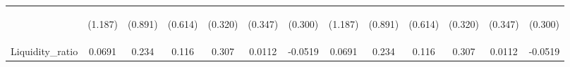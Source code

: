 \documentclass[]{article}
\begin{document}
\begin{center}
\begin{tabular}{lcccccccccccc}
\vspace{4pt} & \begin{footnotesize}(1.187)\end{footnotesize} & \begin{footnotesize}(0.891)\end{footnotesize} & \begin{footnotesize}(0.614)\end{footnotesize} & \begin{footnotesize}(0.320)\end{footnotesize} & \begin{footnotesize}(0.347)\end{footnotesize} & \begin{footnotesize}(0.300)\end{footnotesize} & \begin{footnotesize}(1.187)\end{footnotesize} & \begin{footnotesize}(0.891)\end{footnotesize} & \begin{footnotesize}(0.614)\end{footnotesize} & \begin{footnotesize}(0.320)\end{footnotesize} & \begin{footnotesize}(0.347)\end{footnotesize} & \begin{footnotesize}(0.300)\end{footnotesize} \\
Liquidity\_ratio & 0.0691 & 0.234 & 0.116 & 0.307 & 0.0112 & -0.0519 & 0.0691 & 0.234 & 0.116 & 0.307 & 0.0112 & -0.0519 \\

\end{tabular}
\end{center}
\end{document}
